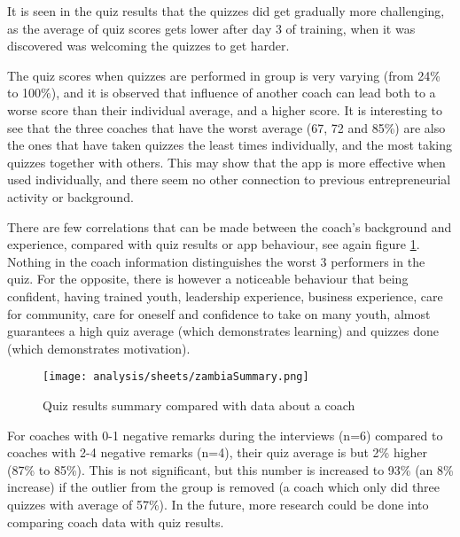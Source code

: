     It is seen in the quiz results that the quizzes did get gradually more challenging, as the average of quiz scores gets lower after day 3 of training, when it was discovered was welcoming the quizzes to get harder.

    The quiz scores when quizzes are performed in group is very varying (from 24\% to 100\%), and it is observed that influence of another coach can lead both to a worse score than their individual average, and a higher score. It is interesting to see that the three coaches that have the worst average (67, 72 and 85\%) are also the ones that have taken quizzes the least times individually, and the most taking quizzes together with others. This may show that the app is more effective when used individually, and there seem no other connection to previous entrepreneurial activity or background.

    There are few correlations that can be made between the coach's background and experience, compared with quiz results or app behaviour, see again figure \ref{fig:zambiaSummary}. Nothing in the coach information distinguishes the worst 3 performers in the quiz. For the opposite, there is however a noticeable behaviour that being confident, having trained youth, leadership experience, business experience, care for community, care for oneself and confidence to take on many youth, almost guarantees a high quiz average (which demonstrates learning) and quizzes done (which demonstrates motivation).

    \begin{figure}[h]
        \centering
        \texttt{[image: analysis/sheets/zambiaSummary.png]}
        \caption{Quiz results summary compared with data about a coach}
        \label{fig:zambiaSummary}
    \end{figure}

    For coaches with 0-1 negative remarks during the interviews (n=6) compared to coaches with 2-4 negative remarks (n=4), their quiz average is but 2\% higher (87\% to 85\%). This is not significant, but this number is increased to 93\% (an 8\% increase) if the outlier from the group is removed (a coach which only did three quizzes with average of 57\%). In the future, more research could be done into comparing coach data with quiz results.


